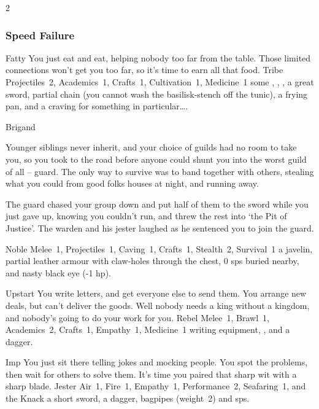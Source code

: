 \begin{multicols}{2}
\begin{itemize}
\end{itemize}

\needspace{16em}
\subsubsection{Speed Failure}

\begin{itemize}

    {Fatty}%
    {
      You just eat and eat, helping nobody too far from the table.
      Those limited connections won't get you too far, so it's time to earn all that food.
    }%
    {Tribe}%
    {Projectiles~2, Academics~1, Crafts~1, Cultivation~1, Medicine~1}%
    {some \rations, \rations, \rations, a great sword, partial chain (you cannot wash the \gls{basilisk}-stench off the tunic), a frying pan, and a craving for something in particular\ldots.}%

    {Brigand}%
    {
  Younger siblings never inherit, and your choice of guilds had no room to take you, so you took to the road before anyone could shunt you into the worst guild of all -- \gls{guard}.
  The only way to survive was to band together with others, stealing what you could from good folks houses at night, and running away.

  The \gls{guard} chased your group down and put half of them to the sword while you just gave up, knowing you couldn't run, and threw the rest into `the Pit of Justice'.
  The warden and his jester laughed as he sentenced you to join the \gls{guard}.
  }%
  {Noble}%
  {Melee~1, Projectiles~1, Caving~1, Crafts~1, Stealth~2, Survival~1}%
  {a javelin, partial leather armour with claw-holes through the chest, 0 \glspl{sp} buried nearby, and nasty black eye (-1 \gls{hp}).}%


  {Upstart}%
  {You write letters, and get everyone else to send them.
  You arrange new deals, but can't deliver the goods.
  Well nobody needs a king without a kingdom, and nobody's going to do your work for you.
  }%
  {Rebel}%
  {Melee~1, Brawl~1, Academics~2, Crafts~1, Empathy~1, Medicine~1}%
  {writing equipment, , and a dagger.}%

  {Imp}%
  {You just sit there telling jokes and mocking people.
  You spot the problems, then wait for others to solve them.
  It's time you paired that sharp wit with a sharp blade.
  }%
  {Jester}%
  {Air~1, Fire~1, Empathy~1, Performance~2, Seafaring~1, and the Knack \snapcaster}%
  {a short sword, a dagger, bagpipes (\gls{weight}~2) and  \glspl{sp}.}%


\end{itemize}
\end{multicols}
